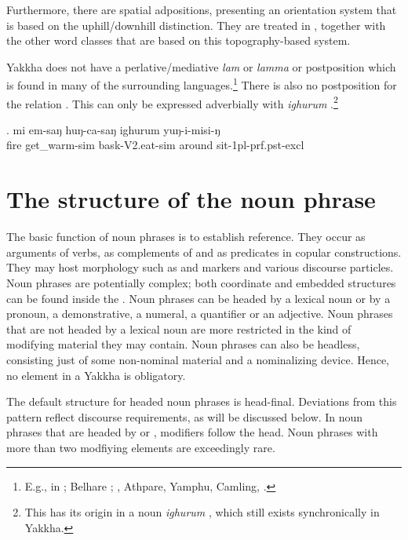 Furthermore, there are spatial adpositions,  presenting an orientation system that is based on the uphill/downhill distinction. They are treated in , together with the other word classes that are based on this topography-based system.

 	
Yakkha does not have a perlative/mediative \emph{lam} or \emph{lamma}  or postposition which is found in many of the surrounding languages.\footnote{E.g., in  \citep{Schikowski2012_Morphology}; Belhare \citep{Bickel2003Belhare};  \citep{Driem1987A-grammar}, Athpare, Yamphu, Camling,  \citep{Ebert2003Kiranti}.} There is also no postposition for the relation . This can only be expressed adverbially with \emph{ighurum} \Next.\footnote{This  has its origin in a noun \emph{ighurum} , which still exists synchronically in Yakkha.}

	\exg.  mi   em-saŋ           huŋ-ca-saŋ            ighurum yuŋ-i-misi-ŋ\\
	fire get\_warm{\sc -sim} bask{\sc -V2.eat-sim} around sit{\sc -1pl-prf.pst-excl}\\
	 
	

\section{The structure of the noun phrase}\label{str-np}

The basic function of noun phrases is to establish reference. They occur as arguments of verbs, as complements of  and as predicates in copular constructions. They may host morphology such as  and  markers  and various discourse particles. Noun phrases are potentially complex; both coordinate and embedded structures can be found inside the . Noun phrases can be headed by a lexical noun or by a pronoun, a demonstrative, a numeral, a quantifier or an adjective. Noun phrases that are not headed by a lexical noun are more restricted in the kind of modifying material they may contain. Noun phrases can also be headless, consisting just of some non-nominal material and a nominalizing device. Hence, no element in a Yakkha  is obligatory. 

 The default structure for headed  noun phrases is head-final. Deviations from this pattern reflect discourse requirements, as will be discussed below.  In noun phrases that are headed by   or , modifiers follow the head. Noun phrases with more than two modfiying elements are exceedingly rare.
 
